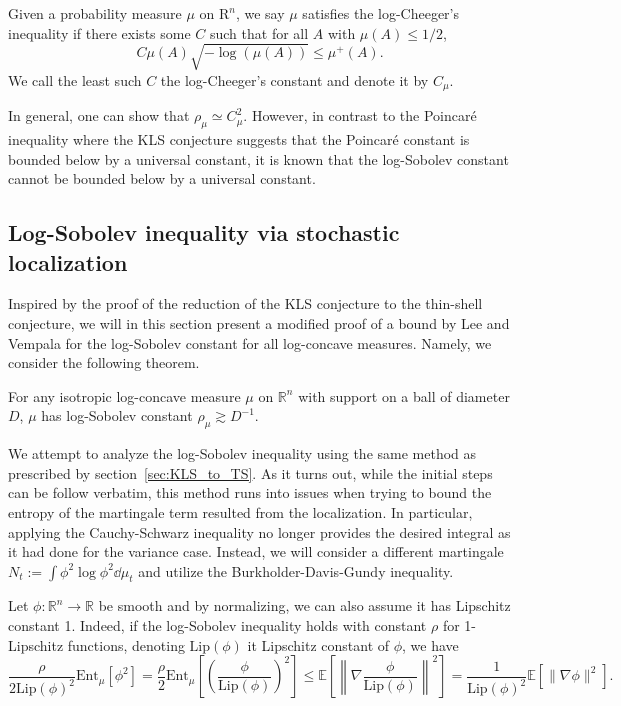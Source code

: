 \begin{definition}
  Given a probability measure \(\mu\) on \(\mbox{R}^n\), we say \(\mu\) satisfies the log-Cheeger's inequality 
  if there exists some \(C\) such that for all \(A\) with \(\mu(A) \le 1 / 2\),
  \[C\mu(A)\sqrt{-\log(\mu(A))} \le \mu^+(A).\]
  We call the least such \(C\) the log-Cheeger's constant and denote it by \(C_\mu\).
\end{definition}

In general, one can show that \(\rho_\mu \simeq C_\mu^2\). However, in contrast to the Poincaré inequality where 
the KLS conjecture suggests that the Poincaré constant is bounded below by a universal constant, it is known 
that the log-Sobolev constant cannot be bounded below by a universal constant. 
\subsection{Log-Sobolev inequality via stochastic localization}

Inspired by the proof of the reduction of the KLS conjecture to the thin-shell conjecture, we will in this section 
present a modified proof of a bound by Lee and Vempala for the log-Sobolev constant for all log-concave measures. 
Namely, we consider the following theorem. 

\begin{theorem}\label{thm:Lee_Vempala}
  For any isotropic log-concave measure \(\mu\) on \(\mathbb{R}^n\) with support on a ball of diameter \(D\), 
  \(\mu\) has log-Sobolev constant \(\rho_\mu \gtrsim D^{-1}\).
\end{theorem}

We attempt to analyze the log-Sobolev inequality using the same method as prescribed by section~\ref{sec:KLS_to_TS}. 
As it turns out, while the initial steps can be follow verbatim, this method runs into issues when trying to 
bound the entropy of the martingale term resulted from the localization. In particular, applying the Cauchy-Schwarz 
inequality no longer provides the desired integral as it had done for the variance case. Instead, we will consider 
a different martingale \(N_t := \int \phi^2 \log \phi^2 \dd \mu_t\) and utilize the Burkholder-Davis-Gundy inequality.

Let \(\phi : \mathbb{R}^n \to \mathbb{R}\) be smooth and by normalizing, we can also assume it has Lipschitz constant 1.  
Indeed, if the log-Sobolev inequality holds with constant \(\rho\) for 1-Lipschitz functions, denoting \(\text{Lip}(\phi)\)
it Lipschitz constant of \(\phi\), we have 
\[\frac{\rho}{2\text{Lip}(\phi)^2}\text{Ent}_\mu[\phi^2] = 
  \frac{\rho}{2}\text{Ent}_\mu\left[\left(\frac{\phi}{\text{Lip}(\phi)}\right)^2\right]
  \le \mathbb{E}\left[\left\|\nabla \frac{\phi}{\text{Lip}(\phi)}\right\|^2\right]
  = \frac{1}{\text{Lip}(\phi)^2} \mathbb{E}[\|\nabla \phi\|^2].\] 

